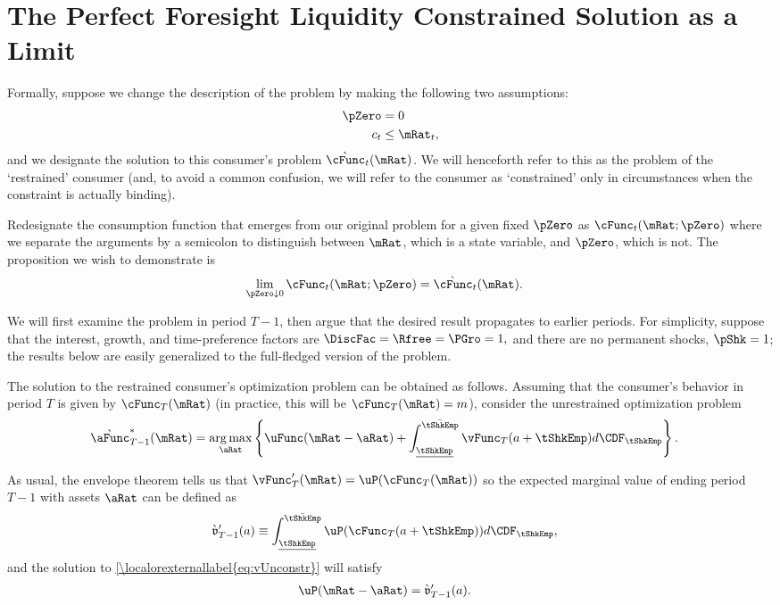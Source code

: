 \documentclass[\econtexRoot/BufferStockTheory.tex]{subfiles}
\begin{document}
\section{The Perfect Foresight Liquidity Constrained Solution as a Limit}
\label{sec:LiqConstrAsLimit}

Formally, suppose we change the description of the problem by making
the following two assumptions:
\begin{eqnarray*}
    \pZero   & = 0
\\  c_{t} & \leq  \mRat_{t} \label{eq:liqconstr},
\end{eqnarray*}
and we designate the solution to this consumer's problem
$\grave{\cFunc}_{t}(\mRat)$.  We will henceforth refer to this as the
problem of the `restrained' consumer (and, to avoid a common
confusion, we will refer to the consumer as `constrained' only in
circumstances when the constraint is actually binding).

Redesignate the consumption function that emerges from our original
problem for a given fixed $\pZero$ as $\cFunc_{t}(\mRat;\pZero)$ where we
separate the arguments by a semicolon to distinguish between $\mRat$,
which is a state variable, and $\pZero$, which is not.  The
proposition we wish to demonstrate is
\begin{align}
  \lim_{\pZero \downarrow 0} \cFunc_{t}(\mRat;\pZero)  & = \grave{\cFunc}_{t}(\mRat). \label{eq:RestrEqUnrestr} 
\end{align}

We will first examine the problem in period $T-1$, then
argue that the desired result propagates to earlier periods.
For simplicity, suppose that the interest, growth, and time-preference
factors are $\DiscFac = \Rfree = \PGro = 1,$ and there are no permanent
shocks, $\pShk=1$; the results below are easily generalized
to the full-fledged version of the problem.

The solution to the restrained consumer's optimization problem can be
obtained as follows.  Assuming that the consumer's behavior in period
$T$ is given by $\cFunc_{T}(\mRat)$ (in practice, this will be
$\cFunc_{T}(\mRat)=m$), consider the unrestrained optimization problem
\begin{align}
  \grave{\aFunc}^{*}_{T-1}(\mRat)  & = \underset{\aRat}{\arg \max} \left\{\uFunc(\mRat-\aRat) +  \int_{\ushort{\tShkEmp}}^{\bar{\tShkEmp}} \vFunc_{T}(a+\tShkEmp) d\CDF_{\tShkEmp} \right\}. \label{eq:vUnconstr}
\end{align}

As usual, the envelope theorem tells us that
$\vFunc_{T}^{\prime}(\mRat)=\uP(\cFunc_{T}(\mRat))$ so the expected marginal
value of ending period $T-1$ with assets $\aRat$ can be defined as
\begin{align}
  \grave{\mathfrak{v}}_{T-1}^{\prime}(a)  & \equiv  \int_{\ushort{\tShkEmp}}^{\bar{\tShkEmp}} \uP(\cFunc_{T}(a+\tShkEmp)) d\CDF_{\tShkEmp}, \notag
\end{align}
and the solution to \eqref{\localorexternallabel{eq:vUnconstr}} will satisfy
\begin{align}
  \uP(\mRat-\aRat)  & =  \grave{\mathfrak{v}}_{T-1}^{\prime}(a) \label{eq:uPConstr}.
%
\end{align}
\end{document}
